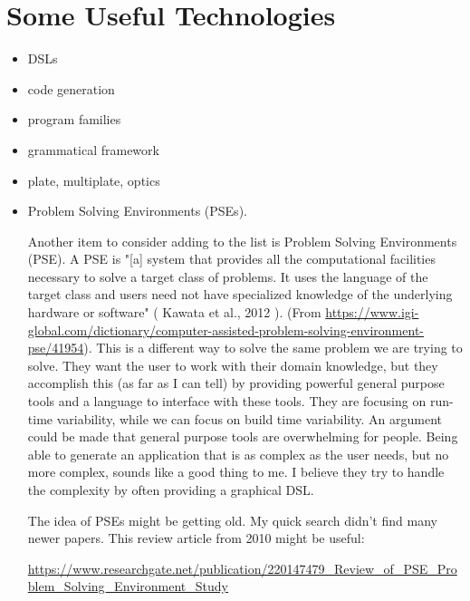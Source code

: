 \documentclass[sigconf,review]{acmart}
\begin{document}
\section{Some Useful Technologies}\label{ch:techniques}


\begin{itemize}
\item DSLs
\item code generation
\item program families
\item grammatical framework
\item plate, multiplate, optics
\item Problem Solving Environments (PSEs).

Another item to consider adding to the list is Problem Solving Environments
(PSE). A PSE is "[a] system that provides all the computational facilities
necessary to solve a target class of problems. It uses the language of the
target class and users need not have specialized knowledge of the underlying
hardware or software" ( Kawata et al., 2012 ). 
(From
\url{https://www.igi-global.com/dictionary/computer-assisted-problem-solving-environment-pse/41954}).
This is a different way to solve the same problem we are trying to solve. They
want the user to work with their domain knowledge, but they accomplish this (as
far as I can tell) by providing powerful general purpose tools and a language
to interface with these tools. They are focusing on run-time variability, while
we can focus on build time variability. An argument could be made that general
purpose tools are overwhelming for people. Being able to generate an
application that is as complex as the user needs, but no more complex, sounds
like a good thing to me. I believe they try to handle the complexity by
often providing a graphical DSL.

The idea of PSEs might be getting old. My quick search didn't find many newer
papers. This review article from 2010 might be useful:

\url{https://www.researchgate.net/publication/220147479_Review_of_PSE_Problem_Solving_Environment_Study}
  
\end{itemize}



\end{document}
